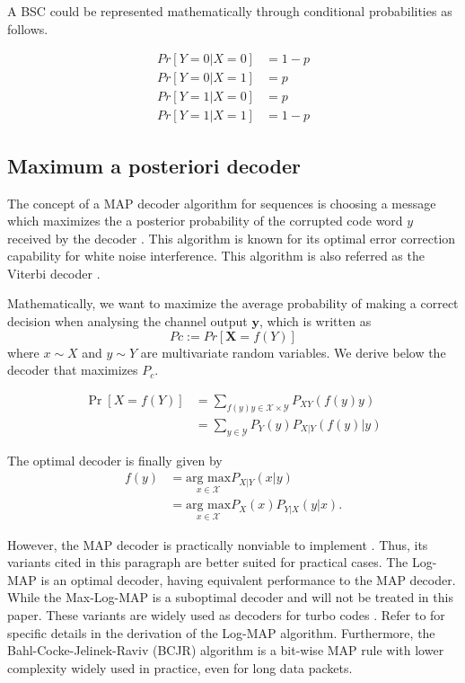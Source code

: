 \documentclass[conference]{IEEEtran}
\begin{document}
A BSC could be represented mathematically through conditional probabilities as follows.

\begin{align*}
Pr[ Y = 0 | X = 0 ] &= 1 - p \\
Pr[ Y = 0 | X = 1 ] &= p \\
Pr[ Y = 1 | X = 0 ] &= p \\
Pr[ Y = 1 | X = 1 ] &= 1 - p
\end{align*}

\subsection{Maximum a posteriori decoder}

The concept of a MAP decoder algorithm for sequences is choosing a message which maximizes the a posterior probability of the corrupted code word $y$ received by the decoder \cite{Worm00turbo-decodingwithout}. This algorithm is known for its optimal error correction capability for white noise interference. This algorithm is also referred as the Viterbi decoder \cite{Viterbi}.

Mathematically, we want to maximize the average probability of making a correct decision when analysing the channel output $\textbf{y}$, which is written as
\begin{equation}\label{eq:MAP1}
Pc := Pr[\textbf{X}=f({Y})]
\end{equation}
where $x \sim X$ and $y \sim Y$ are multivariate random variables. We derive below the decoder that maximizes $P_c$.

\begin{align} 
\Pr \left[ X=f\left( Y\right) \right]& =\sum_{f\left( y\right) y\in \mathcal{X}\times \mathcal{Y}} P_{XY}(f(y)y) \label{eq:MAP2} \\
&=\sum _{y\in \mathcal{Y}}P_{Y}\left( y\right)P_{X|Y}\left( f(y)|y\right) \label{eq:MAP3}
\end{align}

The optimal decoder is finally given by
\begin{align}
f(y) &= \underset{x\in \mathcal{X}}{\text{arg max}} P_{X|Y}(x|y)\label{eq:MAPF1}\\
&= \underset{x\in \mathcal{X}}{\text{arg max}}
P_X(x)P_{Y|X}(y|x).\label{eq:MAPF2}
\end{align}

However, the MAP decoder is practically nonviable to implement \cite{journals/ett/RobertsonHV97}. Thus, its variants cited in this paragraph are better suited for practical cases. The Log-MAP is an optimal decoder, having equivalent performance to the MAP decoder. While the Max-Log-MAP is a suboptimal decoder and will not be treated in this paper. These variants are widely used as decoders for turbo codes \cite{HagenauerJ}. Refer to \cite{journals/ett/RobertsonHV97} for specific details in the derivation of the Log-MAP algorithm. Furthermore, the Bahl-Cocke-Jelinek-Raviv (BCJR) algorithm is a bit-wise MAP rule with lower complexity widely used in practice, even for long data packets.
\end{document}
